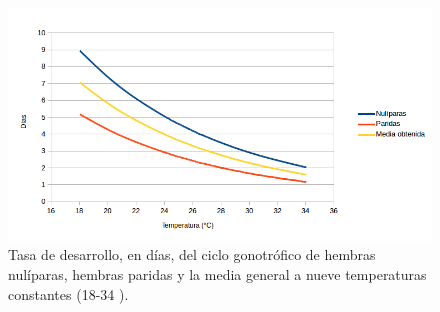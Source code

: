 \begin{figure}
    \centering
    \includegraphics[width=1\textwidth]{capitulo-6/graphics/ciclo-gonotrofico-temperatura.png}
    \caption{\label{fig:ciclo-gonotrofico-temperatura} Tasa de desarrollo, en días, del ciclo
    gonotrófico de hembras nulíparas, hembras paridas y la media general a nueve temperaturas
    constantes (18-34 \textcelsius).}
\end{figure}
